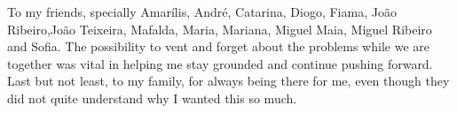 To my friends, specially Amarílis, André, Catarina, Diogo, Fiama, João Ribeiro,João Teixeira, Mafalda, Maria, Mariana, Miguel Maia, Miguel Ribeiro and Sofia. The possibility to vent and forget about the problems while we are together was vital in helping me stay grounded and continue pushing forward.\\

Last but not least, to my family, for always being there for me, even though they did not quite understand why I wanted this so much. \\

\vspace{10mm}
